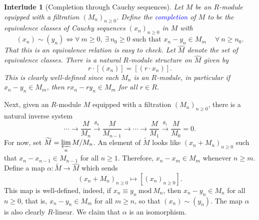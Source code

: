 \documentclass[11pt]{article}
\theoremstyle{thmstyle}
\theoremstyle{defstyle}
\newtheorem{interlude}[theorem]{Interlude}
\newcommand{\wt}[1]{\widetilde{#1}}
\newcommand{\wh}[1]{\widehat{#1}}
\newcommand{\define}[1]{\textcolor{blue}{\textit{#1}}}
\renewcommand{\mod}{~\mathrm{mod}~}
\renewcommand{\ge}{\geqslant}
\begin{document}
\begin{interlude}[Completion through Cauchy sequences]
    Let $M$ be an $R$-module equipped with a filtration $(M_n)_{n\ge 0}$. Define the \define{completion} of $M$ to be the equivalence classes of Cauchy sequences $(x_n)_{n\ge 0}$ in $M$ with 
    \begin{equation*}
        (x_n)\sim(y_n)\iff \forall~m\ge 0,~\exists~n_0\ge 0\text{ such that } x_n - y_n\in M_m\quad~\forall~n\ge n_0.
    \end{equation*}
    That this is an equivalence relation is easy to check. Let $\wh M$ denote the set of equivalence classes. There is a natural $R$-module structure on $\wh M$ given by 
    \begin{equation*}
        r\cdot\left[(x_n)\right] = \left[(r\cdot x_n)\right].
    \end{equation*}
    This is clearly well-defined since each $M_n$ is an $R$-module, in particular if $x_n - y_n\in M_m$, then $rx_n - ry_n\in M_m$ for all $r\in R$.
\end{interlude}

Next, given an $R$-module $M$ equipped with a filtration $(M_n)_{n\ge 0}$, there is a natural inverse system 
\begin{equation*}
    \cdots\to\frac{M}{M_n}\xrightarrow{\theta_n}\frac{M}{M_{n - 1}}\to\cdots\to\frac{M}{M_1}\xrightarrow{\theta_1}\frac{M}{M_0} = 0.
\end{equation*}
For now, set $\displaystyle \wt M = \varprojlim_n M/M_n$. An element of $\wt M$ looks like $(x_n + M_n)_{n\ge 0}$ such that $x_n - x_{n - 1}\in M_{n - 1}$ for all $n\ge 1$. Therefore, $x_n - x_m\in M_m$ whenever $n\ge m$. Define a map $\alpha\colon\wt M\to\wh M$ which sends 
\begin{equation*}
    \left(x_n + M_n\right)_{n\ge 0}\longmapsto\left[(x_n)_{n\ge 0}\right].
\end{equation*}
This map is well-defined, indeed, if $x_n\equiv y_n\mod M_n$, then $x_n - y_n\in M_n$ for all $n\ge 0$, that is, $x_n - y_n\in M_m$ for all $m\ge n$, so that $(x_n)\sim (y_n)$. The map $\alpha$ is also clearly $R$-linear. We claim that $\alpha$ is an isomorphism.
\end{document}

